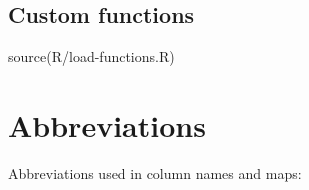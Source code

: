 \documentclass[10pt,landscape,a3paper]{article}
\newenvironment{Shaded}{\begin{snugshade}}{\end{snugshade}}
\newcommand{\DecValTok}[1]{\textcolor[rgb]{0.00,0.00,0.81}{#1}}
\newcommand{\FunctionTok}[1]{\textcolor[rgb]{0.00,0.00,0.00}{#1}}
\newcommand{\NormalTok}[1]{#1}
\newcommand{\OtherTok}[1]{\textcolor[rgb]{0.56,0.35,0.01}{#1}}
\newcommand{\SpecialCharTok}[1]{\textcolor[rgb]{0.00,0.00,0.00}{#1}}
\newcommand{\StringTok}[1]{\textcolor[rgb]{0.31,0.60,0.02}{#1}}
\begin{document}
\begin{Shaded}
\end{Shaded}

\hypertarget{custom-functions}{%
\subsection{Custom functions}\label{custom-functions}}

\begin{Shaded}
\begin{Highlighting}[]
\FunctionTok{source}\NormalTok{(}\StringTok{\textquotesingle{}R/load{-}functions.R\textquotesingle{}}\NormalTok{)}
\end{Highlighting}
\end{Shaded}

\hypertarget{abbreviations}{%
\section{Abbreviations}\label{abbreviations}}

Abbreviations used in column names and maps:
\end{document}
